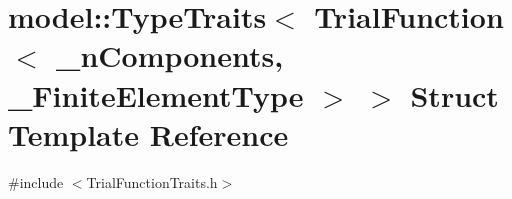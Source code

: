 \hypertarget{structmodel_1_1_type_traits_3_01_trial_function_3_01__n_components_00_01___finite_element_type_01_4_01_4}{}\section{model\+:\+:Type\+Traits$<$ Trial\+Function$<$ \+\_\+n\+Components, \+\_\+\+Finite\+Element\+Type $>$ $>$ Struct Template Reference}
\label{structmodel_1_1_type_traits_3_01_trial_function_3_01__n_components_00_01___finite_element_type_01_4_01_4}


{\ttfamily \#include $<$Trial\+Function\+Traits.\+h$>$}

